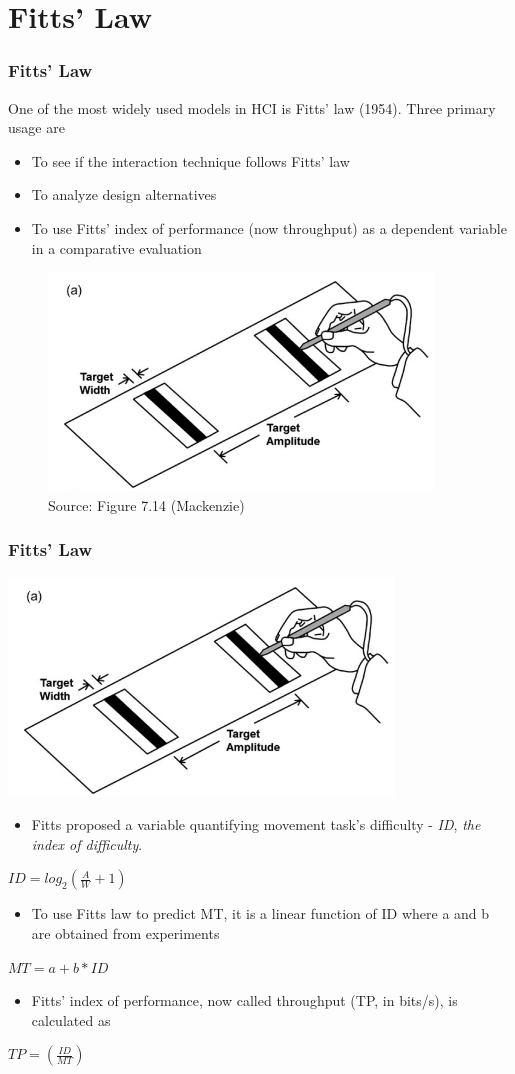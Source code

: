 \documentclass{beamer}
\begin{document}
\section{Fitts' Law}
\begin{frame}
	\frametitle{Fitts' Law}
	One of the most widely used models in HCI is Fitts’ law (1954).  Three primary usage are
	\begin{itemize}
		\item To see if the interaction technique follows Fitts' law
		\item To analyze design alternatives
		\item To use Fitts' index of performance (now throughput) as a dependent variable in a comparative evaluation
	\end{itemize}
	\begin{figure}
		\centering
		\includegraphics[width=0.5\linewidth]{image/7-14}
		\caption{Source: Figure 7.14 (Mackenzie)}
	\end{figure}
\end{frame}

\begin{frame}
	\footnotesize
	\frametitle{Fitts' Law}
		\centering
		\includegraphics[width=0.4\linewidth]{image/7-14}
		\begin{itemize}
		\item Fitts proposed a variable quantifying movement task's difficulty - \textit{ID}, \textit{the index of difficulty}.
	\end{itemize}
	\centering
	$ID = log_{2}\left ( \frac{A}{W} + 1 \right )$
	\begin{itemize}
		\item To use Fitts law to predict MT, it is a linear function of ID where a and b are obtained from experiments
	\end{itemize}
	\centering
	$MT = a + b * ID$
	\begin{itemize}
		\item Fitts' index of performance, now called throughput (TP, in bits/s), is calculated as
	\end{itemize}
	\centering
	$TP = \left ( \frac{ID}{MT} \right )$
\end{frame}
\end{document}
